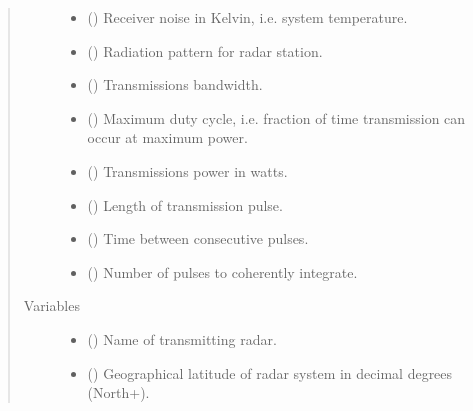 \documentclass[letterpaper,10pt,english]{sphinxmanual}
\begin{document}
\begin{fulllineitems}
\begin{quote}
\begin{description}
\begin{itemize}
\item {} 
 () \textendash{} Receiver noise in Kelvin, i.e. system temperature.

\item {} 
 ({\hyperref[\detokenize{modules/antenna:antenna.BeamPattern}]{}}) \textendash{} Radiation pattern for radar station.

\item {} 
 () \textendash{} Transmissions bandwidth.

\item {} 
 () \textendash{} Maximum duty cycle, i.e. fraction of time transmission can occur at maximum power.

\item {} 
 () \textendash{} Transmissions power in watts.

\item {} 
 () \textendash{} Length of transmission pulse.

\item {} 
 () \textendash{} Time between consecutive pulses.

\item {} 
 () \textendash{} Number of pulses to coherently integrate.

\end{itemize}

\item[{Variables}] \leavevmode\begin{itemize}
\item {} 
 () \textendash{} Name of transmitting radar.

\item {} 
 () \textendash{} Geographical latitude of radar system in decimal degrees  (North+).


\end{itemize}
\end{description}
\end{quote}
\end{fulllineitems}
\end{document}
